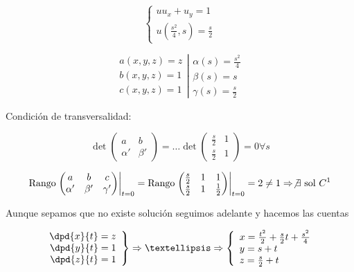 	\begin{example}{6}

		\[
		\left\{
		\begin{array}{l}
			uu_x+ u_y = 1\\
			u(\frac{s^2}{4}, s) = \frac{s}{2}
		\end{array}
		\right.
		\]

		\[ \left. \begin{array}{r}
		a(x,y,z) = z \\
		b(x,y,z) = 1 \\
		c(x,y,z) = 1
		\end{array} \right| \begin{array}{l}
		\alpha(s) = \frac{s^2}{4} \\
		\beta(s) = s \\
		\gamma(s) = \frac{s}{2} \end{array}
		\]


		Condición de transversalidad:

		\[\det \begin{pmatrix}
			a & b \\
			\alpha' & \beta'
		\end{pmatrix} = …
		\det \begin{pmatrix}
			\frac{s}{2} & 1 \\
			\frac{s}{2} & 1
		\end{pmatrix} = 0 \forall s \]

		\[ \text{Rango}
		\left. \begin{pmatrix}
			a & b & c \\
			\alpha' & \beta' & \gamma'
		\end{pmatrix}
		\right|_{t=0} = \text{Rango}
		\left. \begin{pmatrix}
			\frac{s}{2} &1 & 1 \\
			\frac{s}{2} &1 & \frac{1}{2}
		\end{pmatrix} \right|_{t=0} = 2 \neq 1 \Rightarrow \not \exists \text{ sol } C^1
		\]

		Aunque sepamos que no existe solución seguimos adelante y hacemos las cuentas

		\[
		\left. \begin{array}{r}
			 \dpd{x}{t} = z  \\
			 \dpd{y}{t} = 1 \\
			 \dpd{z}{t} = 1
		\end{array}
		 \right\} \Rightarrow … \Rightarrow \left\{
		\begin{array}{l}
		x = \frac{t^2}{2}+\frac{s}{2}t + \frac{s^2}{4} \\
		y = s+t \\
		z = \frac{s}{2}+t
		\end{array}
		\right.
		\]


\end{example}
